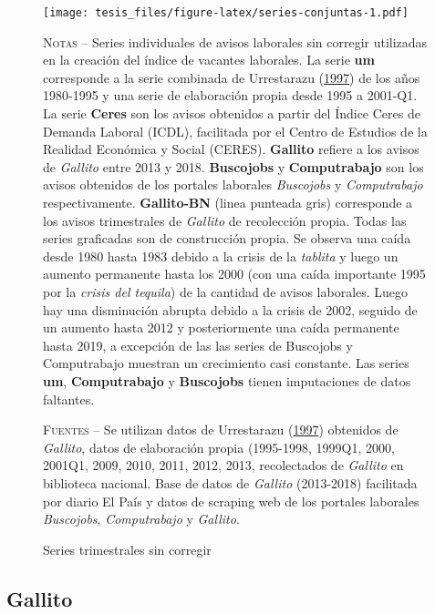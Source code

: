 \documentclass[12pt,oneside]{reedthesis}
\makeatletter
\def\maxwidth{ %
  \ifdim\Gin@nat@width>\linewidth
    \linewidth
  \else
    \Gin@nat@width
  \fi
}
\makeatother
\begin{document}
\begin{figure}
\texttt{[image: tesis\_files/figure-latex/series-conjuntas-1.pdf]}
\caption{Series trimestrales sin corregir}\label{fig:series-conjuntas}\textsc{}

\footnotesize\textsc{Notas} -- Series individuales de avisos laborales sin corregir utilizadas en la creación del índice de vacantes laborales. La serie \textbf{um} corresponde a la serie combinada de Urrestarazu (\protect\hyperlink{ref-Urrestarazu1997}{1997}) de los años 1980-1995 y una serie de elaboración propia desde 1995 a 2001-Q1. La serie \textbf{Ceres} son los avisos obtenidos a partir del Índice Ceres de Demanda Laboral (ICDL), facilitada por el Centro de Estudios de la Realidad Económica y Social (CERES). \textbf{Gallito} refiere a los avisos de \textit{Gallito} entre 2013 y 2018. \textbf{Buscojobs} y \textbf{Computrabajo} son los avisos obtenidos de los portales laborales \textit{Buscojobs} y \textit{Computrabajo} respectivamente. \textbf{Gallito-BN} (linea punteada gris) corresponde a los avisos trimestrales de \textit{Gallito} de recolección propia. Todas las series graficadas son de construcción propia. Se observa una caída desde 1980 hasta 1983 debido a la crisis de la \textit{tablita} y luego un aumento permanente hasta los 2000 (con una caída importante 1995 por la \textit{crisis del tequila}) de la cantidad de avisos laborales. Luego hay una disminución abrupta debido a la crisis de 2002, seguido de un aumento hasta 2012 y posteriormente una caída permanente hasta 2019, a excepción de las las series de Buscojobs y Computrabajo muestran un crecimiento casi constante. Las series \textbf{um}, \textbf{Computrabajo} y \textbf{Buscojobs} tienen imputaciones de datos faltantes.

\textsc{Fuentes} -- Se utilizan datos de Urrestarazu (\protect\hyperlink{ref-Urrestarazu1997}{1997}) obtenidos de \textit{Gallito}, datos de elaboración propia (1995-1998, 1999Q1, 2000, 2001Q1, 2009, 2010, 2011, 2012, 2013, recolectados de \textit{Gallito} en biblioteca nacional. Base de datos de \textit{Gallito} (2013-2018) facilitada por diario El País y datos de scraping web de los portales laborales \textit{Buscojobs}, \textit{Computrabajo} y \textit{Gallito}.
\end{figure}
\hypertarget{gallito}{%
\subsection{Gallito}\label{gallito}}
\end{document}
